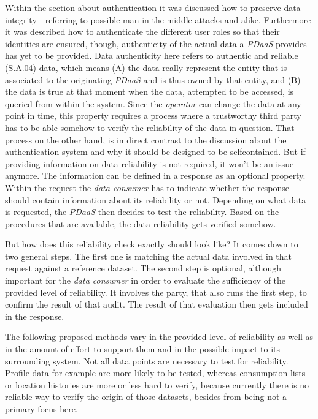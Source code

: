 \documentclass[12pt,english,a4paper,titlepage,cleardoublepage=empty,dottedtoc]{report}
\begin{document}
Within the section \protect\hyperlink{authentication}{about
authentication} it was discussed how to preserve data integrity -
referring to possible man-in-the-middle attacks and alike. Furthermore
it was described how to authenticate the different user roles so that
their identities are ensured, though, authenticity of the actual data a
\emph{PDaaS} provides has yet to be provided. Data authenticity here
refers to authentic and reliable (\protect\hyperlink{sa04}{S.A.04})
data, which means (A) the data really represent the entity that is
associated to the originating \emph{PDaaS} and is thus owned by that
entity, and (B) the data is true at that moment when the data, attempted
to be accessed, is queried from within the system. Since the
\emph{operator} can change the data at any point in time, this property
requires a process where a trustworthy third party has to be able
somehow to verify the reliability of the data in question. That process
on the other hand, is in direct contrast to the discussion about the
\protect\hyperlink{authentication}{authentication system} and why it
should be designed to be selfcontained. But if providing information on
data reliability is not required, it won't be an issue anymore. The
information can be defined in a response as an optional property. Within
the request the \emph{data consumer} has to indicate whether the
response should contain information about its reliability or not.
Depending on what data is requested, the \emph{PDaaS} then decides to
test the reliability. Based on the procedures that are available, the
data reliability gets verified somehow.

But how does this reliability check exactly should look like? It comes
down to two general steps. The first one is matching the actual data
involved in that request against a reference dataset. The second step is
optional, although important for the \emph{data consumer} in order to
evaluate the sufficiency of the provided level of reliability. It
involves the party, that also runs the first step, to confirm the result
of that audit. The result of that evaluation then gets included in the
response.

The following proposed methods vary in the provided level of reliability
as well as in the amount of effort to support them and in the possible
impact to its surrounding system. Not all data points are necessary to
test for reliability. Profile data for example are more likely to be
tested, whereas consumption lists or location histories are more or less
hard to verify, because currently there is no reliable way to verify the
origin of those datasets, besides from being not a primary focus here.
\end{document}
